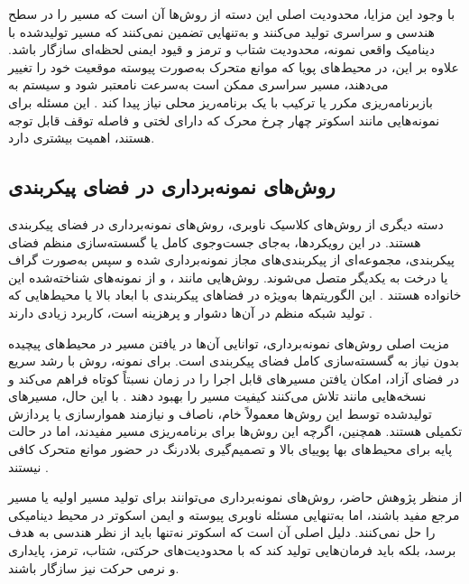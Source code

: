 با وجود این مزایا، محدودیت اصلی این دسته از روش‌ها آن است که مسیر را در سطح هندسی و سراسری تولید می‌کنند و به‌تنهایی تضمین نمی‌کنند که مسیر تولیدشده با دینامیک واقعی نمونه، محدودیت شتاب و ترمز و قیود ایمنی لحظه‌ای سازگار باشد. علاوه بر این، در محیط‌های پویا که موانع متحرک به‌صورت پیوسته موقعیت خود را تغییر می‌دهند، مسیر سراسری ممکن است به‌سرعت نامعتبر شود و سیستم به بازبرنامه‌ریزی مکرر یا ترکیب با یک برنامه‌ریز محلی نیاز پیدا کند %
\cite{LaValle2006Planning,Choset2005Principles}.
این مسئله برای نمونه‌هایی مانند اسکوتر چهار چرخ محرک که دارای لختی و فاصله توقف قابل توجه هستند، اهمیت بیشتری دارد.

\subsection{روش‌های نمونه‌برداری در فضای پیکربندی}

دسته دیگری از روش‌های کلاسیک ناوبری، روش‌های نمونه‌برداری در فضای پیکربندی هستند. در این رویکردها، به‌جای جست‌وجوی کامل یا گسسته‌سازی منظم فضای پیکربندی، مجموعه‌ای از پیکربندی‌های مجاز نمونه‌برداری شده و سپس به‌صورت گراف یا درخت به یکدیگر متصل می‌شوند. روش‌هایی مانند ،  و  از نمونه‌های شناخته‌شده این خانواده هستند %
\cite{Kavraki1996PRM,LaValle1998RRT,Karaman2011RRTstar}.
این الگوریتم‌ها به‌ویژه در فضاهای پیکربندی با ابعاد بالا یا محیط‌هایی که تولید شبکه منظم در آن‌ها دشوار و پرهزینه است، کاربرد زیادی دارند %
\cite{LaValle2006Planning,Choset2005Principles}.

مزیت اصلی روش‌های نمونه‌برداری، توانایی آن‌ها در یافتن مسیر در محیط‌های پیچیده بدون نیاز به گسسته‌سازی کامل فضای پیکربندی است. برای نمونه، روش  با رشد سریع در فضای آزاد، امکان یافتن مسیرهای قابل اجرا را در زمان نسبتاً کوتاه فراهم می‌کند و نسخه‌هایی مانند  تلاش می‌کنند کیفیت مسیر را بهبود دهند %
\cite{LaValle1998RRT,Karaman2011RRTstar}.
با این حال، مسیرهای تولیدشده توسط این روش‌ها معمولاً خام، ناصاف و نیازمند هموارسازی یا پردازش تکمیلی هستند. همچنین، اگرچه این روش‌ها برای برنامه‌ریزی مسیر مفیدند، اما در حالت پایه برای محیط‌های بها پوییای بالا و تصمیم‌گیری بلادرنگ در حضور موانع متحرک کافی نیستند %
\cite{LaValle2006Planning,Choset2005Principles}.

از منظر پژوهش حاضر، روش‌های نمونه‌برداری می‌توانند برای تولید مسیر اولیه یا مسیر مرجع مفید باشند، اما به‌تنهایی مسئله ناوبری پیوسته و ایمن اسکوتر در محیط دینامیکی را حل نمی‌کنند. دلیل اصلی آن است که اسکوتر نه‌تنها باید از نظر هندسی به هدف برسد، بلکه باید فرمان‌هایی تولید کند که با محدودیت‌های حرکتی، شتاب، ترمز، پایداری و نرمی حرکت نیز سازگار باشند.


